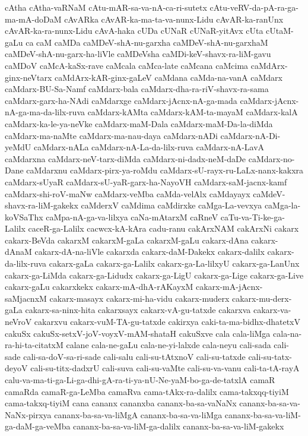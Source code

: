 {cAtha
cAtha-vaRNaM
cAtu-mAR-sa-va-nA-ca-ri-sutetx
cAtu-veRV-da-pA-ra-ga-ma-mA-doDaM
cAvARka
cAvAR-ka-ma-ta-va-nunx-Lidu
cAvAR-ka-ranUnx
cAvAR-ka-ra-nunx-Lidu
cAvA-haka
cUDa
cUNaR
cUNaR-yitAvx
cUta
cUtaM-gaLu
ca
caM
caMDa
caMDeV-shA-nu-garxha
caMDeV-shA-nu-garxhaM
caMDeV-shA-nu-garx-ha-liVle
caMDeVsha
caMDi-keV-shavx-ra-liM-gavu
caMDoV
caMcA-kaSx-rave
caMcala
caMca-late
caMcana
caMcima
caMdArx-ginx-neVtarx
caMdArx-kAR-ginx-gaLeV
caMdana
caMda-na-vanA
caMdarx
caMdarx-BU-Sa-Namf
caMdarx-bala
caMdarx-dha-ra-riV-shavx-ra-sama
caMdarx-garx-ha-NAdi
caMdarxge
caMdarx-jAcnx-nA-ga-mada
caMdarx-jAcnx-nA-ga-ma-da-lilx-ruva
caMdarx-kAMta
caMdarx-kAM-ta-mayaM
caMdarx-kalA
caMdarx-ka-le-ya-neVke
caMdarx-maM-Dala
caMdarx-maM-Da-la-diMda
caMdarx-ma-naMte
caMdarx-ma-nau-daya
caMdarx-nADi
caMdarx-nA-Di-yeMdU
caMdarx-nALa
caMdarx-nA-La-da-lilx-ruva
caMdarx-nA-LavA
caMdarxna
caMdarx-neV-tarx-diMda
caMdarx-ni-dadx-neM-daDe
caMdarx-no-Dane
caMdarxnu
caMdarx-pirx-ya-roMdu
caMdarx-sU-rayx-ru-LaLx-nanx-kakxra
caMdarx-sUyaR
caMdarx-sU-yaR-garx-ha-NayoVH
caMdarx-saM-jacnx-kamf
caMdarx-shi-roV-maNw
caMdarx-veMba
caMda-velAlx
caMdayayx
caMdeV-shavx-ra-liM-gakekx
caMderxV
caMdima
caMdirxke
caMga-La-vevxya
caMga-la-koVSaThx
caMpa-nA-ga-va-lilxya
caNa-mAtarxM
caRneV
caTu-va-Ti-ke-ga-Lalilx
caceR-ga-Lalilx
cacwcx-kA-kAra
cadu-ranu
cakArxNAM
cakArxNi
cakarx
cakarx-BeVda
cakarxM
cakarxM-gaLa
cakarxM-gaLu
cakarx-dAna
cakarx-dAnaM
cakarx-dA-na-liVle
cakarxda
cakarx-daM-Dakekx
cakarx-dalilx
cakarx-da-lilx-ruva
cakarx-gaLa
cakarx-ga-Lalilx
cakarx-ga-La-lilxyU
cakarx-ga-LanUnx
cakarx-ga-LiMda
cakarx-ga-Lidudx
cakarx-ga-LigU
cakarx-ga-Lige
cakarx-ga-Live
cakarx-gaLu
cakarxkekx
cakarx-mA-dhA-rAKayxM
cakarx-mA-jAcnx-saMjacnxM
cakarx-masayx
cakarx-mi-ha-vidu
cakarx-muderx
cakarx-mu-derx-gaLa
cakarx-sa-ninx-hita
cakarxsayx
cakarx-vA-gu-tatxde
cakarxva
cakarx-va-neVroV
cakarxvu
cakarx-vuM-TA-gu-tatxde
cakirxya
caki-ta-ma-bidhx-dhatetxV
cakuSx
cakuSx-setxV-joV-voyxV-mAM-shataH
cakuSxve
cala
cala-liMga
cala-na-ra-hi-ta-citatxM
calane
cala-ne-gaLu
cala-ne-yi-lalxde
cala-neyu
cali-sada
cali-sade
cali-sa-doV-sa-ri-sade
cali-salu
cali-su-tAtxnoV
cali-su-tatxde
cali-su-tatx-deyoV
cali-su-titx-dadxrU
cali-suva
cali-su-vaMte
cali-su-va-vanu
cali-ta-tA-rayA
calu-va-ma-ti-ga-Li-ga-dhi-gA-ra-ti-ya-nU-Ne-yaM-bo-ga-de-tatxlA
camaR
camaRda
camaR-ga-LeMba
camaRva
cama-tAkx-ra-dalilx
cama-takxqq-tiyiM
cama-takxq-tiyiM
cana
cananx
cananxba
cananx-ba-sa-vaNaNx
cananx-ba-sa-va-NaNx-pirxya
cananx-ba-sa-va-liMgA
cananx-ba-sa-va-liMga
cananx-ba-sa-va-liM-ga-daM-ga-veMba
cananx-ba-sa-va-liM-ga-dalilx
cananx-ba-sa-va-liM-gakekx
}
